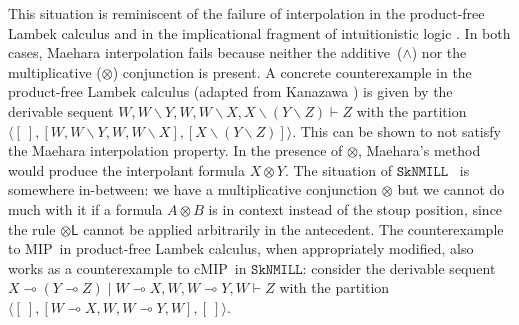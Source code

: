 \documentclass[sn-mathphys-num]{sn-jnl}%
\newcommand{\GG}{\Gamma}
\newcommand{\GD}{\Delta}
\newcommand{\vd}{\vdash}
\newcommand{\tl}{\otimes \mathsf{L}}
\newcommand{\tr}{\otimes\mathsf{R}}
\newcommand{\pass}{\mathsf{pass}}
\newcommand{\ax}{\mathsf{ax}}
\newcommand{\ot}{\otimes}
\newcommand{\lolli}{\multimap}
\newcommand{\bsls}{\backslash}
\newcommand{\SkNMILL}{$\mathtt{SkNMILL}$}
\newcommand{\mf}[1]{\mathsf{#1}}
\newcommand{\MIP}{\textsf{MIP}}
\newcommand{\cMIP}{\textsf{cMIP}}
\theoremstyle{thmstyleone}%
\theoremstyle{thmstyletwo}%
\theoremstyle{thmstylethree}%
\begin{document}
This situation is reminiscent of the failure of interpolation in the product-free Lambek calculus \cite{Pentus1997} and in the implicational fragment of intuitionistic logic \cite{Kanazawa2006}.
In both cases, Maehara
interpolation fails because neither the additive~($\land$) nor the multiplicative ($\ot$) conjunction is present.
A concrete counterexample in the product-free Lambek calculus (adapted from Kanazawa \cite{Kanazawa2006}) is given by the derivable sequent $W, W\bsls Y, W , W \bsls X , X \bsls (Y \bsls Z) \vd Z$ with the partition $\langle [\ ] , [W, W\bsls Y, W , W \bsls X], [X \bsls (Y \bsls Z)] \rangle$. This can be shown to not satisfy the Maehara interpolation property. In the presence of $\ot$,  Maehara's method would produce the interpolant formula $X \ot Y$. The situation of \SkNMILL~ is somewhere in-between: we have a multiplicative conjunction $\ot$ but we cannot do much with it if a formula $A \ot B$ is in context instead of the stoup position, since the rule $\tl$ cannot be applied arbitrarily in the antecedent.
The counterexample to \MIP~in product-free Lambek calculus, when appropriately modified, also works as a counterexample to \cMIP~in \SkNMILL: consider the derivable sequent  $X \lolli (Y \lolli Z) \mid W \lolli X, W , W \lolli Y, W \vd Z$ with the partition $\langle [\ ] , [W \lolli X, W , W \lolli Y, W], [\ ] \rangle$.
\end{document}
